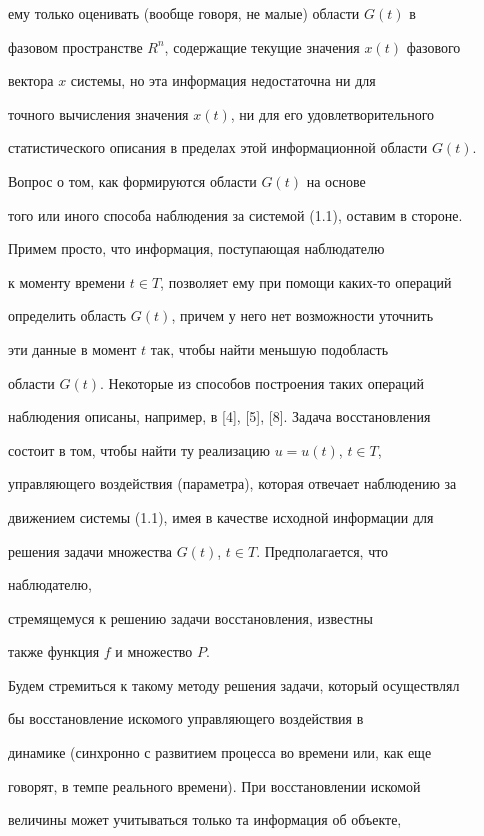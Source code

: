 ему только оценивать (вообще говоря, не малые) области $G(t)$ в 


фазовом пространстве $R^n$, содержащие текущие значения $x(t)$ фазового 


вектора $x$ системы, но эта информация недостаточна ни для 


точного вычисления значения $x(t)$, ни для его удовлетворительного 


статистического описания в пределах этой информационной области $G(t)$. 


Вопрос о том, как формируются области $G(t)$ на основе 


того или иного способа наблюдения за системой (1.1), оставим в стороне. 


Примем просто, что информация, поступающая наблюдателю 


к моменту времени $t\in T$, позволяет ему при помощи каких-то операций 


определить область $G(t)$, причем у него нет возможности уточнить 


эти данные в момент $t$ так, чтобы найти меньшую подобласть 


области $G(t)$. Некоторые из способов построения таких операций 


наблюдения описаны, например, в [4], [5], [8]. Задача восстановления 


состоит в том, чтобы найти ту реализацию $u=u(t)$, $t\in T$, 


управляющего воздействия (параметра), которая отвечает наблюдению за 


движением системы (1.1), имея в качестве исходной информации для 


решения задачи множества $G(t)$, $t\in T$. Предполагается, что 


наблюдателю, 


стремящемуся к решению задачи восстановления, известны 


также функция $f$ и множество $P$. 


 


Будем стремиться к такому методу решения задачи, который осуществлял 


бы восстановление искомого управляющего воздействия в 


динамике (синхронно с развитием процесса во времени или, как еще 


говорят, в темпе реального времени). При восстановлении искомой 


величины может учитываться только та информация об объекте, 



